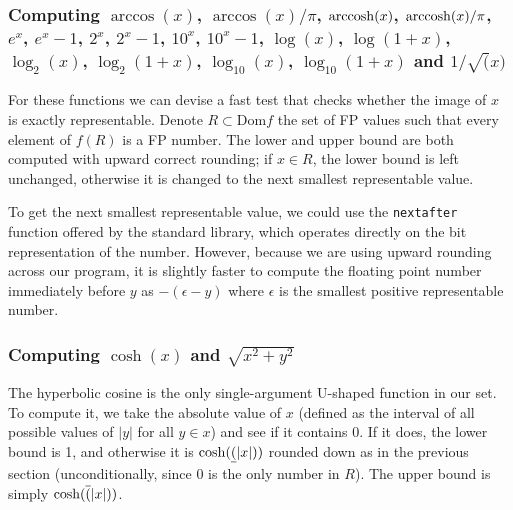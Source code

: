 \subsubsection{Computing $\arccos(x)$, $\arccos(x)/\pi$, $\operatorname{arccosh}(x)$, $\operatorname{arccosh}(x)/\pi$, $e^x$, $e^x-1$, $2^x$, $2^x-1$, $10^x$, $10^x-1$, $\log(x)$, $\log(1+x)$, $\log_2(x)$, $\log_2(1+x)$, $\log_{10}(x)$, $\log_{10}(1+x)$ and $1/\sqrt(x)$}
For these functions we can devise a fast test that checks whether the image of $x$ is exactly representable.
Denote $R\subset\mathrm{Dom}f$ the set of FP values such that every element of $f(R)$ is a FP number.
The lower and upper bound are both computed with upward correct rounding; if $x\in R$, the lower bound is left unchanged, otherwise it is changed to the next smallest representable value.

To get the next smallest representable value, we could use the \texttt{nextafter} function offered by the standard library, which operates directly on the bit representation of the number. However, because we are using upward rounding across our program, it is slightly faster to compute the floating point number immediately before $y$ as $-(\epsilon-y)$ where $\epsilon$ is the smallest positive representable number.


\subsubsection{Computing $\cosh(x)$ and $\sqrt{x^2+y^2}$}
The hyperbolic cosine is the only single-argument U-shaped function in our set. To compute it, we take the absolute value of $x$ (defined as the interval of all possible values of $|y|$ for all $y\in x$) and see if it contains 0. If it does, the lower bound is 1, and otherwise it is $\cosh(\underline{(}|x|))$ rounded down as in the previous section (unconditionally, since 0 is the only number in $R$). The upper bound is simply $\cosh(\overline{(}|x|))$.

